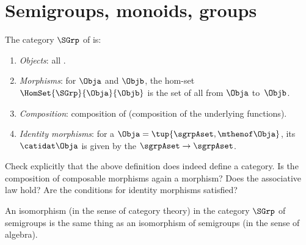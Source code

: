
\section[Semigroups, monoids, groups]{Semigroups, monoids, groups}
\label{sec:cats-of-semigroups-monoids-groups}


\begin{ctdefinition}
    \label{def:SGrp}
    The category $\SGrp$ of  is:
    \begin{enumerate}
        \item \emph{Objects}: all .
        \item \emph{Morphisms}: for  $\Obja$ and $\Objb$, %
              the hom-set $\HomSet{\SGrp}{\Obja}{\Objb}$ is the set of all  from $\Obja$ to~$\Objb$.
        \item \emph{Composition}: composition of  (composition of the underlying functions).
        \item \emph{Identity morphisms}: for a  $\Obja = \tup{\sgrpAset, {{\mthenof \Obja}}}$, its  $\catidat\Obja$ is given by the  $\sgrpAset \to \sgrpAset$.
    \end{enumerate}
\end{ctdefinition}

\begin{gradedexercise}
    \label{ex:CategorySemigroups}
    Check explicitly that the above definition does indeed define a category.
    Is the composition of composable morphisms again a morphism? Does the associative law hold? Are the conditions for identity morphisms satisfied?
\end{gradedexercise}


\begin{remark}
    An isomorphism (in the sense of category theory) in the category $\SGrp$ of semigroups is the same thing as an isomorphism of semigroups (in the sense of algebra).
\end{remark}

